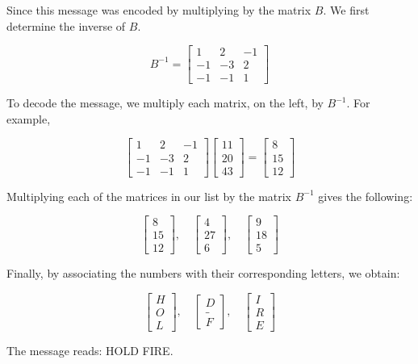 \begin{solution}
    Since this message was encoded by multiplying by the matrix \( B \). We first determine the inverse of \( B \).

    \[ B^{-1} = \begin{bmatrix} 1 & 2 & -1 \\ -1 & -3 & 2 \\ -1 & -1 & 1 \end{bmatrix} \]

    To decode the message, we multiply each matrix, on the left, by \( B^{-1} \). For example,

    \[ \begin{bmatrix} 1 & 2 & -1 \\ -1 & -3 & 2 \\ -1 & -1 & 1 \end{bmatrix} \begin{bmatrix} 11 \\ 20 \\ 43 \end{bmatrix} = \begin{bmatrix} 8 \\ 15 \\ 12 \end{bmatrix} \]

    Multiplying each of the matrices in our list by the matrix \( B^{-1} \) gives the following:

    \[
        \begin{bmatrix} 8 \\ 15 \\ 12 \end{bmatrix}, \quad
        \begin{bmatrix} 4 \\ 27 \\ 6 \end{bmatrix}, \quad
        \begin{bmatrix} 9 \\ 18 \\ 5 \end{bmatrix}
    \]

    Finally, by associating the numbers with their corresponding letters, we obtain:

    \[
        \begin{bmatrix} H \\ O \\ L \end{bmatrix}, \quad
        \begin{bmatrix} D \\ \_ \\ F \end{bmatrix}, \quad
        \begin{bmatrix} I \\ R \\ E \end{bmatrix}
    \]


    The message reads: HOLD FIRE.
\end{solution}

